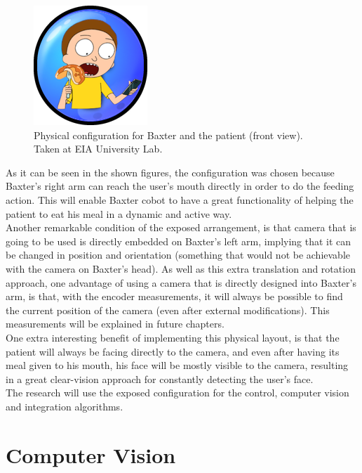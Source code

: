 \documentclass[11pt]{report} %
\begin{document}
\begin{figure}[H]
    \centering
    \includegraphics[width=0.3\linewidth]{assets/imgs/TODO.png}
    \caption{Physical configuration for Baxter and the patient (front view). Taken at EIA University Lab.} 
    \label{fig_baxter_configuration_2}
\end{figure}

As it can be seen in the shown figures, the configuration was chosen because Baxter's right arm can reach the user's mouth directly in order to do the feeding action. This will enable Baxter cobot to have a great functionality of helping the patient to eat his meal in a dynamic and active way.\\

Another remarkable condition of the exposed arrangement, is that camera that is going to be used is directly embedded on Baxter's left arm, implying that it can be changed in position and orientation (something that would not be achievable with the camera on Baxter's head). As well as this extra translation and rotation approach, one advantage of using a camera that is directly designed into Baxter's arm, is that, with the encoder measurements, it will always be possible to find the current position of the camera (even after external modifications). This measurements will be explained in future chapters.\\

One extra interesting benefit of implementing this physical layout, is that the patient will always be facing directly to the camera, and even after having its meal given to his mouth, his face will be mostly visible to the camera, resulting in a great clear-vision approach for constantly detecting the user's face.\\

The research will use the exposed configuration for the control, computer vision and integration algorithms.\\

\chapter{Computer Vision}
\end{document}
